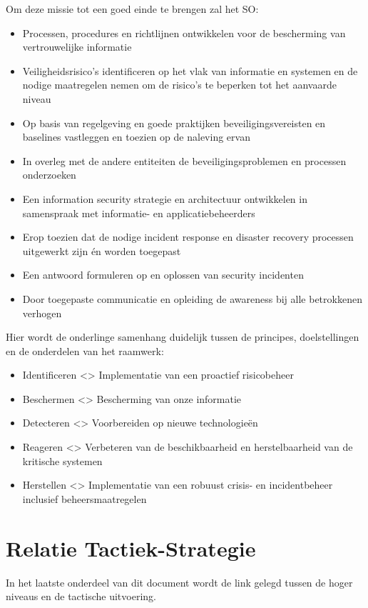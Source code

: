 \documentclass[11pt]{article}
\begin{document}
Om deze missie tot een goed einde te brengen zal het SO:
\begin{itemize}
\item Processen, procedures en richtlijnen ontwikkelen voor de bescherming van vertrouwelijke informatie
\item Veiligheidsrisico's identificeren op het vlak van informatie en systemen en de nodige maatregelen nemen om de risico's te beperken tot het aanvaarde niveau
\item Op basis van regelgeving en goede praktijken beveiligingsvereisten en baselines vastleggen en toezien op de naleving ervan
\item In overleg met de andere entiteiten de beveiligingsproblemen en processen onderzoeken
\item Een information security strategie en architectuur ontwikkelen in samenspraak met informatie- en applicatiebeheerders
\item Erop toezien dat de nodige incident response en disaster recovery processen uitgewerkt zijn én worden toegepast
\item Een antwoord formuleren op en oplossen van security incidenten
\item Door toegepaste communicatie en opleiding de awareness bij alle betrokkenen verhogen
\end{itemize}

Hier wordt de onderlinge samenhang duidelijk tussen de principes, doelstellingen en de onderdelen van het raamwerk:
\begin{itemize}
\item Identificeren <> Implementatie van een proactief risicobeheer
\item Beschermen <> Bescherming van onze informatie
\item Detecteren <> Voorbereiden op nieuwe technologieën
\item Reageren <> Verbeteren van de beschikbaarheid en herstelbaarheid van de kritische systemen
\item Herstellen <> Implementatie van een robuust crisis- en incidentbeheer inclusief beheersmaatregelen
\end{itemize}

\section{Relatie Tactiek-Strategie}
\label{sec:orga379ade}
In het laatste onderdeel van dit document wordt de link gelegd tussen de hoger niveaus en de tactische uitvoering.
\end{document}

